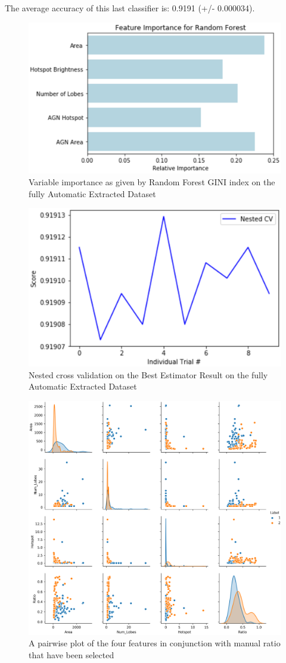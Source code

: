 \documentclass[conference]{IEEEtran}
\begin{document}
The average accuracy of this last classifier is: 0.9191 (+/- 0.000034).

\begin{figure}[h]
    \centering
    \includegraphics[width=0.5 \textwidth]{EPS/agnfeat.eps}
    \caption{Variable importance as given by Random Forest GINI index on the fully Automatic Extracted Dataset}
    \label{fig:agnfeat}
\end{figure}
\begin{figure}[h]
    \centering
    \includegraphics[width=0.5 \textwidth]{EPS/nestedlast.eps}
    \caption{Nested cross validation on the Best Estimator Result on the fully Automatic Extracted Dataset}
    \label{fig:nested2}
\end{figure}

\begin{figure}
    \centering
    \includegraphics[width=\textwidth]{EPS/pairwise.eps}
    \caption{A pairwise plot of the four features in conjunction with manual ratio that have been selected}
    \label{fig:pairwise}
\end{figure}
\end{document}
